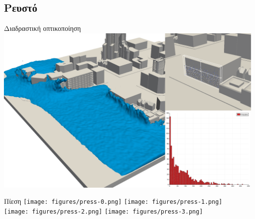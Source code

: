 \documentclass[8pt,sans,mathserif,aspectratio=43]{beamer}
\begin{document}

\subsection{Ρευστό}

\begin{frame}{Διαδραστική οπτικοποίηση}
  \includegraphics[width=\textwidth]{figures/paraview.png}
\end{frame}


\begin{frame}{Πίεση}
  \texttt{[image: figures/press-0.png]}
  \texttt{[image: figures/press-1.png]}\\
  \texttt{[image: figures/press-2.png]}
  \texttt{[image: figures/press-3.png]}
\end{frame}

\end{document}
